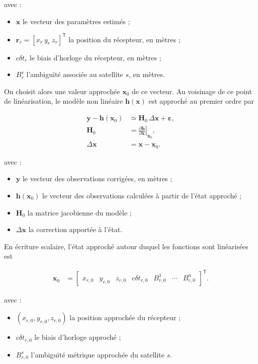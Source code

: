 avec :

\begin{itemize}
    \item $\mathbf x$ le vecteur des paramètres estimés ;
    \item $\mathbf r_r=[x_r\ y_r\ z_r]^{\mathsf T}$ la position du
    récepteur, en mètres ;
    \item $c\delta t_r$ le biais d'horloge du récepteur, en mètres ;
    \item $B_r^s$ l'ambiguïté associée au satellite $s$, en mètres.
\end{itemize}


On choisit alors une valeur approchée $\mathbf x_0$ de ce vecteur. Au voisinage
de ce point de linéarisation, le modèle non linéaire
$\mathbf h(\mathbf x)$ est approché au premier ordre par

\begin{align}
\mathbf y-\mathbf h(\mathbf x_0)
&\simeq
\mathbf H_0\,\Delta\mathbf x+\boldsymbol\varepsilon,
\\
\mathbf H_0
&=
\left.
\frac{\partial\mathbf h}{\partial\mathbf x}
\right|_{\mathbf x_0},
\\
\Delta\mathbf x
&=
\mathbf x-\mathbf x_0.
\label{eq:linearized_model}
\end{align}

avec :

\begin{itemize}
    \item $\mathbf y$ le vecteur des observations corrigées, en mètres ;
    \item $\mathbf h(\mathbf x_0)$ le vecteur des observations calculées à
    partir de l'état approché ;
    \item $\mathbf H_0$ la matrice jacobienne du modèle ;
    \item $\Delta\mathbf x$ la correction apportée à l'état.
\end{itemize}

En écriture scalaire, l'état approché autour duquel les fonctions sont
linéarisées est

\begin{align}
\mathbf x_0
&=
\begin{bmatrix}
x_{r,0} & y_{r,0} & z_{r,0} & c\delta t_{r,0} &
B_{r,0}^{1} & \cdots & B_{r,0}^{n}
\end{bmatrix}^{\mathsf T}.
\label{eq:approximate_state}
\end{align}

avec :

\begin{itemize}
    \item $(x_{r,0},y_{r,0},z_{r,0})$ la position approchée du récepteur ;
    \item $c\delta t_{r,0}$ le biais d'horloge approché ;
    \item $B_{r,0}^{s}$ l'ambiguïté métrique approchée du satellite $s$.
\end{itemize}

